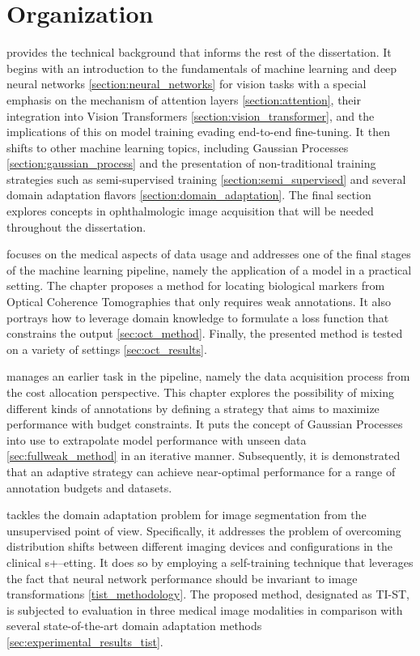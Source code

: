 \section{Organization}
 provides the technical background that informs the rest of the dissertation. It begins with an introduction to the fundamentals of machine learning and deep neural networks \cref{section:neural_networks} for vision tasks with a special emphasis on the mechanism of attention layers \cref{section:attention}, their integration into Vision Transformers \cref{section:vision_transformer}, and the implications of this on model training evading end-to-end fine-tuning. It then shifts to other machine learning topics, including Gaussian Processes \cref{section:gaussian_process} and the presentation of non-traditional training strategies such as semi-supervised training \cref{section:semi_supervised} and several domain adaptation flavors \cref{section:domain_adaptation}. The final section explores concepts in ophthalmologic image acquisition that will be needed throughout the dissertation.

 focuses on the medical aspects of data usage and addresses one of the final stages of the machine learning pipeline, namely the application of a model in a practical setting. The chapter proposes a method for locating biological markers from Optical Coherence Tomographies that only requires weak annotations. It also portrays how to leverage domain knowledge to formulate a loss function that constrains the output \cref{sec:oct_method}. Finally, the presented method is tested on a variety of settings \cref{sec:oct_results}.

 manages an earlier task in the pipeline, namely the data acquisition process from the cost allocation perspective. This chapter explores the possibility of mixing different kinds of annotations by defining a strategy that aims to maximize performance with budget constraints. It puts the concept of Gaussian Processes into use to extrapolate model performance with unseen data \cref{sec:fullweak_method} in an iterative manner. Subsequently, it is demonstrated that an adaptive strategy can achieve near-optimal performance for a range of annotation budgets and datasets.

 tackles the domain adaptation problem for image segmentation from the unsupervised point of view. Specifically, it addresses the problem of overcoming distribution shifts between different imaging devices and configurations in the clinical s+--etting. It does so by employing a self-training technique that leverages the fact that neural network performance should be invariant to image transformations \cref{tist_methodology}. The proposed method, designated as TI-ST, is subjected to evaluation in three medical image modalities in comparison with several state-of-the-art domain adaptation methods \cref{sec:experimental_results_tist}.

